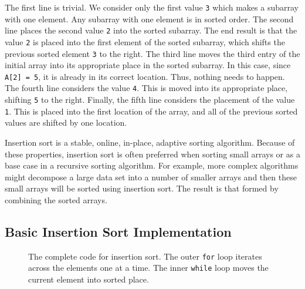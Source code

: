 The first line is trivial. We consider only the first value \lstinline{3} which makes a subarray with one element. Any subarray with one element is in sorted order. The second line places the second value \lstinline{2} into the sorted subarray. The end result is that the value \lstinline{2} is placed into the first element of the sorted subarray, which shifts the previous sorted element \lstinline{3} to the right. The third line moves the third entry of the initial array into its appropriate place in the sorted subarray. In this case, since \lstinline{A[2] = 5}, it is already in its correct location. Thus, nothing needs to happen. The fourth line considers the value \lstinline{4}. This is moved into its appropriate place, shifting \lstinline{5} to the right. Finally, the fifth line considers the placement of the value \lstinline{1}. This is placed into the first location of the array, and all of the previous sorted values are shifted by one location.

Insertion sort is a stable, online, in-place, adaptive sorting algorithm.  Because of these properties, insertion sort is often preferred when sorting small arrays or as a base case in a recursive sorting algorithm. For example, more complex algorithms might decompose a large data set into a number of smaller arrays and then these small arrays will be sorted using insertion sort. The result is that formed by combining the sorted arrays.

\subsection{Basic Insertion Sort Implementation}
\label{sec:basic_insertion_sort}

\begin{figure}

\caption{  The complete code for insertion sort. The outer \lstinline{for} loop iterates across the elements one at a time. The inner \lstinline{while} loop moves the current element into sorted place.  }
\label{fig:insertion_sort.cpp}
\end{figure}

